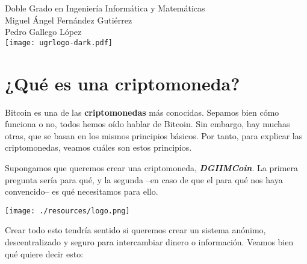 \documentclass[10pt, a4paper]{article}
\let\Oldpart\part
\newcommand{\parttitle}{}
\renewcommand{\part}[1]{\pagebreak\Oldpart{#1}\renewcommand{\parttitle}{#1}}
\theoremstyle{theorem-style}
\theoremstyle{theorem-style}
\theoremstyle{definition-style}
\theoremstyle{remark-style}
\theoremstyle{example-style}
\theoremstyle{definition-style}
\theoremstyle{remark-style}
\newcommand{\autor}{Miguel Ángel Fernández Gutiérrez\\Pedro Gallego López}
\newcommand{\grado}{Doble Grado en Ingeniería Informática y Matemáticas}
\begin{document}
\begin{titlepage}

  \parbox[t]{\textwidth}{
  	\raggedright %
  	\fontsize{40pt}{40pt}\selectfont\sffamily{}
  }

	\vfill
	
	\parbox[t]{\textwidth}{
		\raggedright %
		\sffamily\large
		\grado\\
		{\Large \autor }\\[15pt]
		\texttt{[image: ugrlogo-dark.pdf]}
	}

\end{titlepage}


\thispagestyle{empty}
\tableofcontents
\newpage


\part{¿Qué es una criptomoneda?}

Bitcoin es una de las \textbf{criptomonedas} más conocidas. Sepamos bien
cómo funciona o no, todos hemos oído hablar de Bitcoin. Sin embargo, hay
muchas otras, que se basan en los mismos principios básicos. Por tanto,
para explicar las criptomonedas, veamos cuáles son estos principios.

Supongamos que queremos crear una criptomoneda, \textbf{\emph{DGIIMCoin}}. La
primera pregunta sería para qué, y la segunda --en caso de que el para
qué nos haya convencido-- es qué necesitamos para ello.

\begin{center}
	\texttt{[image: ./resources/logo.png]}
\end{center}

Crear todo esto tendría sentido si queremos crear un sistema anónimo,
descentralizado y seguro para intercambiar dinero o información. Veamos
bien qué quiere decir esto:
\end{document}
